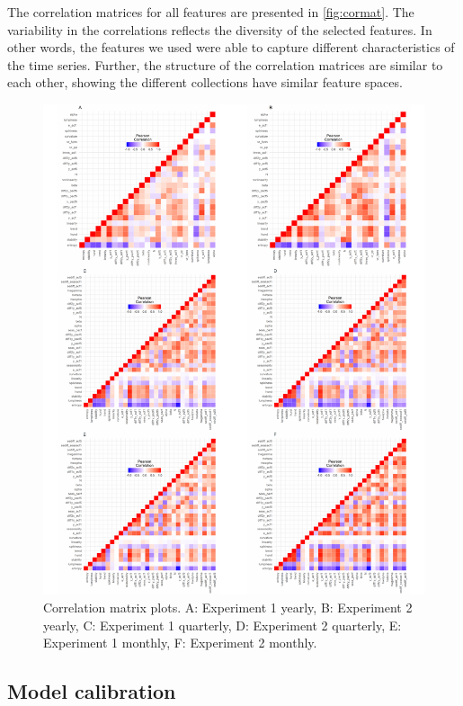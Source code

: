 \documentclass[11pt,a4paper,]{article}
\theoremstyle{definition}
\theoremstyle{definition}
\theoremstyle{definition}
\theoremstyle{remark}
\begin{document}
The correlation matrices for all features are presented in
\autoref{fig:cormat}. The variability in the correlations reflects the
diversity of the selected features. In other words, the features we used
were able to capture different characteristics of the time series.
Further, the structure of the correlation matrices are similar to each
other, showing the different collections have similar feature spaces.

\begin{figure}

{\centering \includegraphics[width=\textwidth]{figure/cormat-1} 

}

\caption{ Correlation matrix plots. A: Experiment 1 yearly, B: Experiment 2 yearly, C: Experiment 1 quarterly, D: Experiment 2 quarterly, E: Experiment 1 monthly, F: Experiment 2 monthly.}\label{fig:cormat}
\end{figure}

\subsection{Model calibration}\label{model-calibration}
\end{document}
